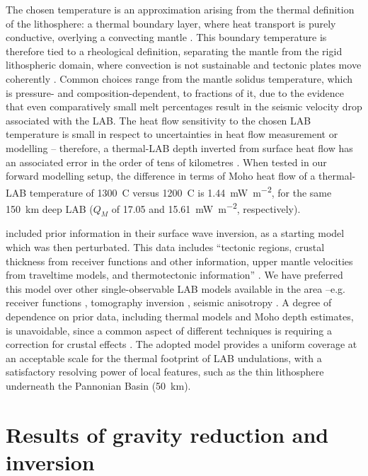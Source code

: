 {The chosen temperature is an approximation arising from the thermal definition of the lithosphere: a thermal boundary layer, where heat transport is purely conductive, overlying a convecting mantle \parencites{Eaton2009}{fischer2010lab}.
This boundary temperature is therefore tied to a rheological definition, separating the mantle from the rigid lithospheric domain, where convection is not sustainable and tectonic plates move coherently \parencite{Steinberger2016}.
Common choices range from the mantle solidus temperature, which is pressure- and composition-dependent, to fractions of it, due to the evidence that even comparatively small melt percentages result in the seismic velocity drop associated with the LAB.
The heat flow sensitivity to the chosen LAB temperature is small in respect to uncertainties in heat flow measurement or modelling -- therefore, a thermal-LAB depth inverted from surface heat flow has an associated error in the order of tens of kilometres \parencite{Afonso2013multiobsI}.
When tested in our forward modelling setup, the difference in terms of Moho heat flow of a thermal-LAB temperature of 1300~\textdegree C versus 1200~\textdegree C is 1.44~\si{\milli \watt \per \square \metre}, for the same 150~km deep LAB ($Q_M$ of 17.05 and 15.61~\si{\milli \watt \per \square \metre}, respectively).

\textcite{Pasyanos2014} included prior information in their surface wave inversion, as a starting model which was then perturbated.
This data includes ``tectonic regions, crustal thickness from receiver functions and other information, upper mantle velocities from traveltime models, and thermotectonic information'' \parencite[p. 2154, ][]{Pasyanos2014}.
We have preferred this model over other single-observable LAB models available in the area --e.g. receiver functions \parencite{Geissler2010}, tomography inversion \parencite{Tesauro2009}, seismic anisotropy \parencite{Plomerova2010}.
A degree of dependence on prior data, including thermal models and Moho depth estimates, is unavoidable, since a common aspect of different techniques is requiring a correction for crustal effects \parencite{Jones2010}.
The adopted model provides a uniform coverage at an acceptable scale for the thermal footprint of LAB undulations, with a satisfactory resolving power of local features, such as the thin lithosphere underneath the Pannonian Basin (\SI{50}{\kilo \metre}).

\section{Results of gravity reduction and inversion}
\label{s:Appl:DiscGrav}

}
